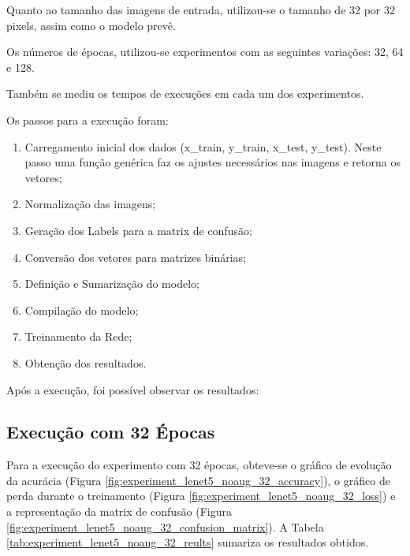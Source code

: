 \documentclass[12pt]{article}
\begin{document}
Quanto ao tamanho das imagens de entrada, utilizou-se o tamanho de 32 por 32 pixels, assim como o modelo prevê.

Os números de épocas, utilizou-se experimentos com as seguintes variações: 32, 64 e 128.

Também se mediu os tempos de execuções em cada um dos experimentos.

Os passos para a execução foram:

\begin{enumerate}
  \item Carregamento inicial dos dados (x\_train, y\_train, x\_test, y\_test). Neste passo uma função genérica faz os ajustes necessários nas imagens e retorna os vetores;
  \item Normalização das imagens;
  \item Geração dos Labels para a matrix de confusão;
  \item Conversão dos vetores para matrizes binárias;
  \item Definição e Sumarização do modelo;
  \item Compilação do modelo;
  \item Treinamento da Rede;
  \item Obtenção dos resultados.
\end{enumerate}

Após a execução, foi possível observar os resultados:

\subsection{Execução com 32 Épocas}

Para a execução do experimento com 32 épocas, obteve-se o gráfico de evolução da acurácia (Figura \ref{fig:experiment_lenet5_noaug_32_accuracy}), o gráfico de perda durante o treinamento (Figura \ref{fig:experiment_lenet5_noaug_32_loss}) e a representação da matrix de confusão (Figura \ref{fig:experiment_lenet5_noaug_32_confusion_matrix}). A Tabela \ref{tab:experiment_lenet5_noaug_32_reults} sumariza os resultados obtidos.
\end{document}
